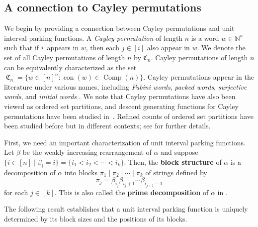 \documentclass{amsart}
\newcommand{\N}{\mathbb{N}}
\DeclareMathOperator{\Comp}{Comp}
\DeclareMathOperator{\con}{con}
\newcommand{\defterm}{\textbf}
\DeclareMathOperator{\C}{\mathfrak{C}}
\theoremstyle{definition}
\begin{document}
\subsection{A connection to Cayley permutations }\label{subsec:cayley biject to upf}
We begin by providing a connection between Cayley permutations and unit interval parking functions.
A \emph{Cayley permutation} of length $n$ is a word $w\in \N^n$ such that if $i$~appears in $w$, then each $j\in [i]$ also appear in $w$. 
We denote the set of all Cayley permutations of length $n$ by $\mathfrak{C}_n$.  
Cayley permutations of length $n$ can be equivalently characterized as the set $\C_n = \{w\in [n]^n : \con(w) \in\Comp(n) \}$.
Cayley permutations appear in the literature under various names, including \emph{Fubini words}, \textit{packed words}, \textit{surjective words}, and \textit{initial words} \cite{Marberg_2021, caylerian}. 
We note that Cayley permutations have also been viewed as ordered set partitions, and descent generating functions for Cayley permutations have been studied in~\cite{cerbai2024caylerianpolynomials}. Refined counts of ordered set partitions have been studied before but in different contexts; see  for further details. 

First, we need an important characterization of unit interval parking functions. 
Let $\beta$ be the weakly increasing rearrangement of $\alpha$ and suppose $\{i\in [n]\mid \beta_i=i\}=\{i_1 < i_2 < \cdots < i_k\}$.  
Then, the \defterm{block structure} \cite[Definition 2.7]{bradt2024unit} of $\alpha$ is a decomposition of $\alpha$ into blocks $\pi_1 \mid \pi_2\mid\cdots \mid \pi_{k}$ of strings defined by
\[\pi_j=\beta_{i_j}\beta_{i_j+1}\cdots \beta_{i_{j+1}-1}\]
for each $j\in [k]$. 
This is also called the \textbf{prime decomposition} of $\alpha$ in \cite[Remark 2.7]{unit_perm}.

The following result establishes that a unit interval parking function is uniquely determined by its block sizes and the positions of its blocks.
\end{document}
